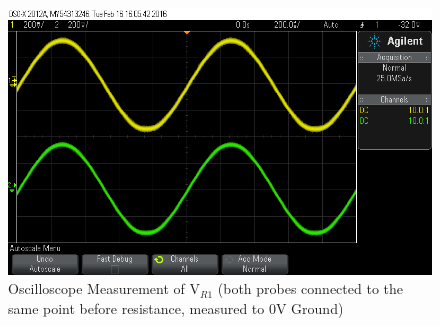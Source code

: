 \begin{figure}[H] %
\begin{center}
\includegraphics[width=1\linewidth]{LabOne/AC_MeasurementTwo}
\end{center}
\caption{Oscilloscope Measurement of V$_{R1}$ (both probes connected to the same point before resistance, measured to 0V Ground)}
\label{fig:AC_OsciR1}
\end{figure}







